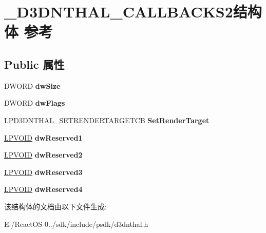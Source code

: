 \hypertarget{struct___d3_d_n_t_h_a_l___c_a_l_l_b_a_c_k_s2}{}\section{\+\_\+\+D3\+D\+N\+T\+H\+A\+L\+\_\+\+C\+A\+L\+L\+B\+A\+C\+K\+S2结构体 参考}
\label{struct___d3_d_n_t_h_a_l___c_a_l_l_b_a_c_k_s2}
\subsection*{Public 属性}
\begin{DoxyCompactItemize}
\item 
\mbox{\label{struct___d3_d_n_t_h_a_l___c_a_l_l_b_a_c_k_s2_a223be420bcc32b7dc25a5bcc05b20b0f}} 
D\+W\+O\+RD {\bfseries dw\+Size}
\item 
\mbox{\label{struct___d3_d_n_t_h_a_l___c_a_l_l_b_a_c_k_s2_af5b796acec8dd065d58d5f740538cd47}} 
D\+W\+O\+RD {\bfseries dw\+Flags}
\item 
\mbox{\label{struct___d3_d_n_t_h_a_l___c_a_l_l_b_a_c_k_s2_ad4cdaca03755afc689f85b0eaa572b60}} 
L\+P\+D3\+D\+N\+T\+H\+A\+L\+\_\+\+S\+E\+T\+R\+E\+N\+D\+E\+R\+T\+A\+R\+G\+E\+T\+CB {\bfseries Set\+Render\+Target}
\item 
\mbox{\label{struct___d3_d_n_t_h_a_l___c_a_l_l_b_a_c_k_s2_ad417ce6c58dd0759fe0a21d82fb7b789}} 
\hyperlink{interfacevoid}{L\+P\+V\+O\+ID} {\bfseries dw\+Reserved1}
\item 
\mbox{\label{struct___d3_d_n_t_h_a_l___c_a_l_l_b_a_c_k_s2_a906cd6d2268de6a7ad69ff502da85982}} 
\hyperlink{interfacevoid}{L\+P\+V\+O\+ID} {\bfseries dw\+Reserved2}
\item 
\mbox{\label{struct___d3_d_n_t_h_a_l___c_a_l_l_b_a_c_k_s2_a9bc230335b9dbfc7ad4c46d530c9f7aa}} 
\hyperlink{interfacevoid}{L\+P\+V\+O\+ID} {\bfseries dw\+Reserved3}
\item 
\mbox{\label{struct___d3_d_n_t_h_a_l___c_a_l_l_b_a_c_k_s2_aa3fdab983df21af6dc3ad0f219d6f708}} 
\hyperlink{interfacevoid}{L\+P\+V\+O\+ID} {\bfseries dw\+Reserved4}
\end{DoxyCompactItemize}


该结构体的文档由以下文件生成\+:\begin{DoxyCompactItemize}
\item 
E\+:/\+React\+O\+S-\/0../sdk/include/psdk/d3dnthal.\+h\end{DoxyCompactItemize}
